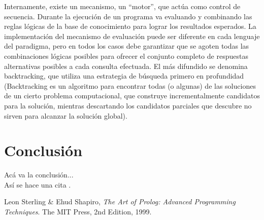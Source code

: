 \documentclass[12pt,titlepage]{report}
\begin{document}
Internamente, existe un mecanismo, un “motor”, que actúa como control de secuencia. Durante la ejecución de un programa va evaluando y combinando las reglas lógicas de la base de conocimiento para lograr los resultados esperados. La implementación del mecanismo de evaluación puede ser diferente en cada lenguaje del paradigma, pero en todos los casos debe garantizar que se agoten todas las combinaciones lógicas posibles para ofrecer el conjunto completo de respuestas alternativas posibles a cada consulta efectuada. El más difundido se denomina backtracking, que utiliza una estrategia de búsqueda primero en profundidad (Backtracking es un algoritmo para encontrar todas (o algunas) de las soluciones de un cierto problema computacional, que construye incrementalmente candidatos para la solución, mientras descartando los candidatos parciales que descubre no sirven para alcanzar la solución global).



\section{Conclusión}
Acá va la conclusión... \\
Así se hace una cita \cite{artofprolog}.
	
\clearpage
\begin{thebibliography}{9}
   Leon Sterling \& Ehud Shapiro, \emph{The Art of Prolog: Advanced Programming Techniques}. The MIT Press, 2nd Edition, 1999.
\end{thebibliography}

\end{document}
